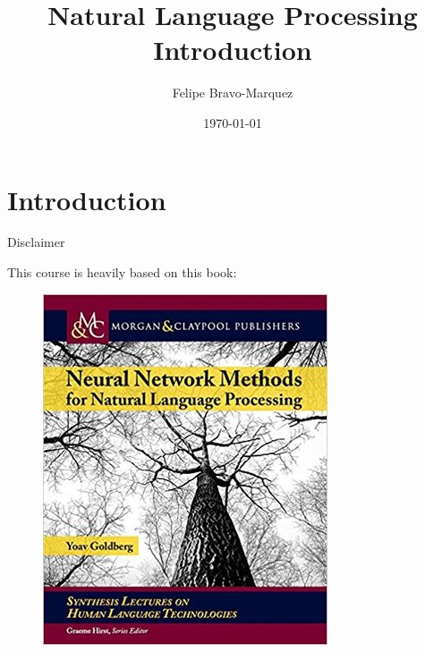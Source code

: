 \documentclass[handout]{beamer}
\title{Natural Language Processing \\ Introduction}
\author[Felipe Bravo Márquez]{\footnotesize
 \textcolor[rgb]{0.00,0.00,1.00}{Felipe Bravo-Marquez}}
\date{\today}
\begin{document}
\begin{frame}
\titlepage


\end{frame}


\section{Introduction}

\begin{frame}{Disclaimer}

 This course is heavily based on this book:
   \begin{figure}[h]
        	\includegraphics[scale = 0.4]{pics/goldbergNLP.jpg}
        \end{figure}
 
\end{frame}
\end{document}
